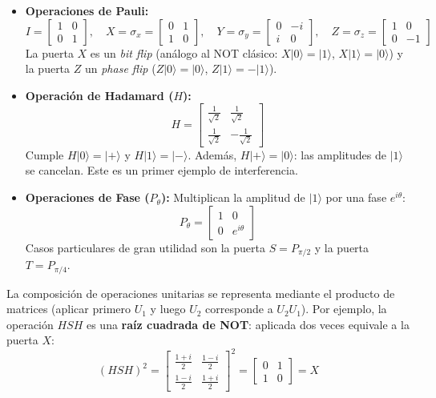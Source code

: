 \documentclass[12pt, a4paper]{article}
\begin{document}
\begin{itemize}
    \item \textbf{Operaciones de Pauli:}
    \[
    I = \begin{bmatrix} 1 & 0 \\ 0 & 1 \end{bmatrix}, \quad
    X = \sigma_x = \begin{bmatrix} 0 & 1 \\ 1 & 0 \end{bmatrix}, \quad
    Y = \sigma_y = \begin{bmatrix} 0 & -i \\ i & 0 \end{bmatrix}, \quad
    Z = \sigma_z = \begin{bmatrix} 1 & 0 \\ 0 & -1 \end{bmatrix}
    \]
    La puerta $X$ es un \textit{bit flip} (análogo al NOT clásico: $X|0\rangle = |1\rangle$, $X|1\rangle = |0\rangle$) y la puerta $Z$ un \textit{phase flip} ($Z|0\rangle = |0\rangle$, $Z|1\rangle = -|1\rangle$).

    \item \textbf{Operación de Hadamard ($H$):}
    \[ H = \begin{bmatrix} \frac{1}{\sqrt{2}} & \frac{1}{\sqrt{2}} \\ \frac{1}{\sqrt{2}} & -\frac{1}{\sqrt{2}} \end{bmatrix} \]
    Cumple $H|0\rangle = |+\rangle$ y $H|1\rangle = |-\rangle$. Además, $H|+\rangle = |0\rangle$: las amplitudes de $|1\rangle$ se cancelan. Este es un primer ejemplo de interferencia.

    \item \textbf{Operaciones de Fase ($P_\theta$):}
    Multiplican la amplitud de $|1\rangle$ por una fase $e^{i\theta}$:
    \[ P_\theta = \begin{bmatrix} 1 & 0 \\ 0 & e^{i\theta} \end{bmatrix} \]
    Casos particulares de gran utilidad son la puerta $S = P_{\pi/2}$ y la puerta $T = P_{\pi/4}$.
\end{itemize}

La composición de operaciones unitarias se representa mediante el producto de matrices (aplicar primero $U_1$ y luego $U_2$ corresponde a $U_2 U_1$). Por ejemplo, la operación $HSH$ es una \textbf{raíz cuadrada de NOT}: aplicada dos veces equivale a la puerta $X$:
\[ (HSH)^2 = \begin{bmatrix} \frac{1+i}{2} & \frac{1-i}{2} \\ \frac{1-i}{2} & \frac{1+i}{2} \end{bmatrix}^2 = \begin{bmatrix} 0 & 1 \\ 1 & 0 \end{bmatrix} = X \]

\newpage


\end{document}
